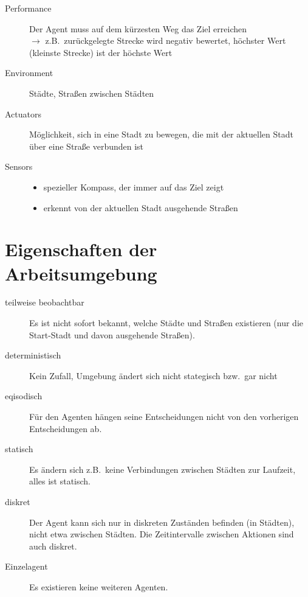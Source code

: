 \documentclass[a4paper,draft=false,oneside,12pt,ngerman]{scrreprt}
\begin{document}
\begin{description}
    \item[Performance] Der Agent muss auf dem kürzesten Weg das Ziel
        erreichen\\
        $\rightarrow$ z.B.\ zurückgelegte Strecke wird negativ bewertet,
        höchster Wert (kleinste Strecke) ist der höchste Wert
    \item[Environment] Städte, Straßen zwischen Städten
    \item[Actuators] Möglichkeit, sich in eine Stadt zu bewegen, die mit der
        aktuellen Stadt über eine Straße verbunden ist
    \item[Sensors]
        \begin{itemize}
            \item spezieller Kompass, der immer auf das Ziel zeigt
            \item erkennt von der aktuellen Stadt ausgehende Straßen
        \end{itemize}
\end{description}


\section{Eigenschaften der Arbeitsumgebung}
\label{sec:eigenschaften_der_arbeitsumgebung}

\begin{description}
    \item[teilweise beobachtbar]
        Es ist nicht sofort bekannt, welche Städte und Straßen existieren (nur
        die Start-Stadt und davon ausgehende Straßen).
    \item[deterministisch]
        Kein Zufall, Umgebung ändert sich nicht stategisch bzw.\ gar nicht
    \item[eqisodisch]
        Für den Agenten hängen seine Entscheidungen nicht von den vorherigen
        Entscheidungen ab.
    \item[statisch]
        Es ändern sich z.B.\ keine Verbindungen zwischen Städten zur Laufzeit,
        alles ist statisch.
    \item[diskret]
        Der Agent kann sich nur in diskreten Zuständen befinden (in Städten),
        nicht etwa zwischen Städten. Die Zeitintervalle zwischen Aktionen sind
        auch diskret.
    \item[Einzelagent]
        Es existieren keine weiteren Agenten.
\end{description}
\end{document}
